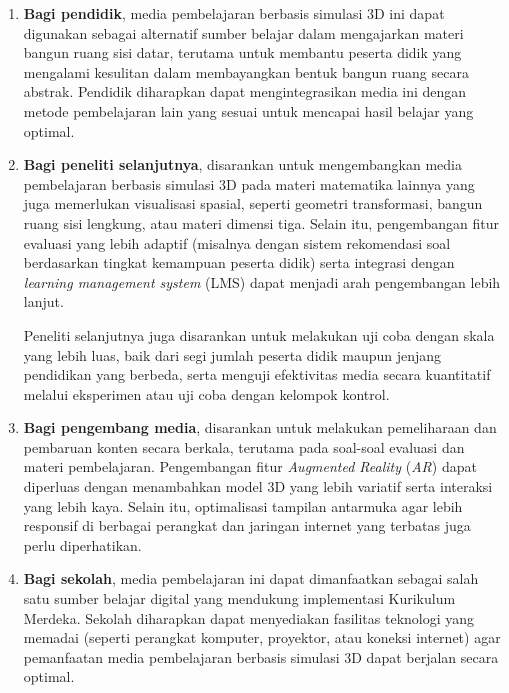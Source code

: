 \begin{enumerate}
    \item \textbf{Bagi pendidik}, media pembelajaran berbasis simulasi 3D ini dapat digunakan sebagai alternatif sumber belajar dalam mengajarkan materi bangun ruang sisi datar, terutama untuk membantu peserta didik yang mengalami kesulitan dalam membayangkan bentuk bangun ruang secara abstrak. Pendidik diharapkan dapat mengintegrasikan media ini dengan metode pembelajaran lain yang sesuai untuk mencapai hasil belajar yang optimal.

    \item \textbf{Bagi peneliti selanjutnya}, disarankan untuk mengembangkan media pembelajaran berbasis simulasi 3D pada materi matematika lainnya yang juga memerlukan visualisasi spasial, seperti geometri transformasi, bangun ruang sisi lengkung, atau materi dimensi tiga. Selain itu, pengembangan fitur evaluasi yang lebih adaptif (misalnya dengan sistem rekomendasi soal berdasarkan tingkat kemampuan peserta didik) serta integrasi dengan \textit{learning management system} (LMS) dapat menjadi arah pengembangan lebih lanjut.
    
    \hspace*{1cm}Peneliti selanjutnya juga disarankan untuk melakukan uji coba dengan skala yang lebih luas, baik dari segi jumlah peserta didik maupun jenjang pendidikan yang berbeda, serta menguji efektivitas media secara kuantitatif melalui eksperimen atau uji coba dengan kelompok kontrol.

    \item \textbf{Bagi pengembang media}, disarankan untuk melakukan pemeliharaan dan pembaruan konten secara berkala, terutama pada soal-soal evaluasi dan materi pembelajaran. Pengembangan fitur \textit{Augmented Reality} (\textit{AR}) dapat diperluas dengan menambahkan model 3D yang lebih variatif serta interaksi yang lebih kaya. Selain itu, optimalisasi tampilan antarmuka agar lebih responsif di berbagai perangkat dan jaringan internet yang terbatas juga perlu diperhatikan.
    
    \item \textbf{Bagi sekolah}, media pembelajaran ini dapat dimanfaatkan sebagai salah satu sumber belajar digital yang mendukung implementasi Kurikulum Merdeka. Sekolah diharapkan dapat menyediakan fasilitas teknologi yang memadai (seperti perangkat komputer, proyektor, atau koneksi internet) agar pemanfaatan media pembelajaran berbasis simulasi 3D dapat berjalan secara optimal.
\end{enumerate}